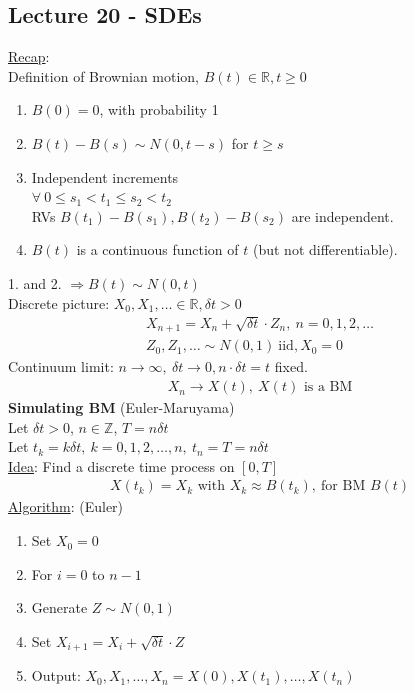 \documentclass[12pt, letterpaper]{article}
\begin{document}
\subsection{Lecture 20 - SDEs}
\underline{Recap}: \\
Definition of Brownian motion, $B(t) \in \mathbb{R}, t \ge 0$
\begin{enumerate}
    \item $B(0) = 0$, with probability 1
    \item $B(t) - B(s) \sim N(0,t-s)$ for $t \ge s$
    \item Independent increments  \\
    $\forall\ 0 \le s_1 < t_1 \le s_2 < t_2$ \\
    RVs $B(t_1)-B(s_1), B(t_2)-B(s_2)$ are independent.
    \item $B(t)$ is a continuous function of $t$ (but not differentiable).
\end{enumerate}
1. and 2. $\Rightarrow B(t) \sim N(0,t)$ \\
Discrete picture: $X_0,X_1,\dots \in \mathbb{R}, \delta t >0$
\begin{align*}
    X_{n+1} = X_n + \sqrt{\delta t}\cdot Z_n,\ n=0,1,2,\dots \\
    Z_0, Z_1, \dots \sim N(0,1)\ \text{iid}, X_0 = 0
\end{align*}
Continuum limit: $n\rightarrow\infty,\ \delta t \rightarrow 0, n\cdot \delta t = t$ fixed.
\begin{align*}
    X_n \rightarrow X(t),\ X(t) \text{ is a BM}
\end{align*}
\textbf{Simulating BM} (Euler-Maruyama)\\
Let $\delta t > 0$, $n \in \mathbb{Z}$, $T = n\delta t$ \\
Let $t_k = k\delta t,\ k = 0,1,2,\dots,n,\ t_n = T = n \delta t$ \\
\underline{Idea}: Find a discrete time process on $[0,T]$
\begin{align*}
    X(t_k) = X_k \text{ with } X_k \approx B(t_k),\ \text{for BM } B(t)
\end{align*}
\underline{Algorithm}: (Euler)
\begin{enumerate}
    \item Set $X_0 = 0$ 
    \item For $i = 0$ to $n-1$
    \item Generate $Z \sim N(0,1)$
    \item Set $X_{i+1} = X_i + \sqrt{\delta t} \cdot Z$
    \item Output: $X_0, X_1, \dots, X_n = X(0), X(t_1), \dots, X(t_n)$
\end{enumerate}
\end{document}
